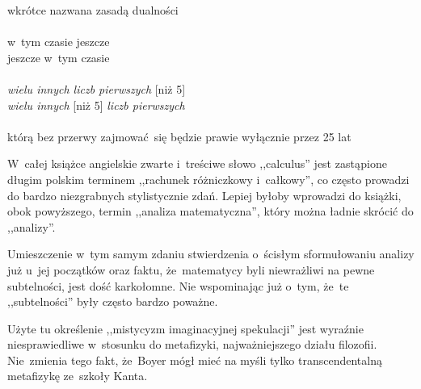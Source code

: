 \documentclass[a4paper,11pt]{article}
\begin{document}
\Pow  wkrótce nazwana zasadą dualności \\
 \\
\Jest w~tym czasie jeszcze \\
\Pow  jeszcze w~tym czasie \\
 \\
\Jest \emph{wielu innych liczb pierwszych} [niż 5] \\
\Pow  \emph{wielu innych} [niż 5] \emph{liczb pierwszych} \\
 \\
\Jest którą bez przerwy zajmować~się będzie prawie wyłącznie przez 25 lat \\
\Pow

\vspace{\spaceTwo}








\start W~całej książce angielskie zwarte i~treściwe słowo ,,calculus''
jest zastąpione długim polskim terminem ,,rachunek różniczkowy
i~całkowy'', co często prowadzi do bardzo niezgrabnych stylistycznie
zdań. Lepiej byłoby wprowadzi do książki, obok powyższego, termin
,,analiza matematyczna'', który można ładnie skrócić do ,,analizy''.

\vspace{\spaceThree}




\vspace{\spaceFour}


\start {} Umieszczenie w~tym samym zdaniu stwierdzenia
o~ścisłym sformułowaniu analizy już u~jej początków oraz faktu,
że~matematycy byli niewrażliwi na pewne subtelności, jest dość
karkołomne. Nie wspominając już o~tym, że~te ,,subtelności'' były
często bardzo poważne.

\vspace{\spaceFour}


\start {} Użyte tu określenie ,,mistycyzm imaginacyjnej
spekulacji'' jest wyraźnie niesprawiedliwe w~stosunku do metafizyki,
najważniejszego działu filozofii. Nie~zmienia tego fakt, że~Boyer mógł
mieć na myśli tylko transcendentalną metafizykę ze~szkoły Kanta.
\end{document}
